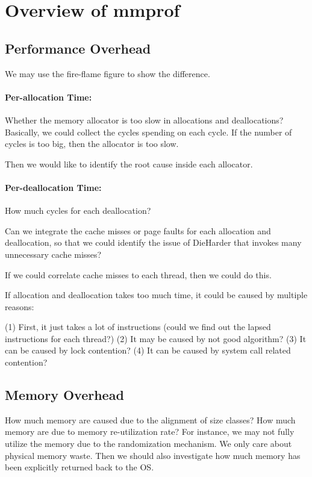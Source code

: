 \section{Overview of mmprof}

\subsection{Performance Overhead}

We may use the fire-flame figure to show the difference. 

\paragraph{Per-allocation Time:}
Whether the memory allocator is too slow in allocations and deallocations? 
Basically, we could collect the cycles spending on each cycle. If the number of cycles is too big, then the allocator is too slow. 

Then we would like to identify the root cause inside each allocator. 

\paragraph{Per-deallocation Time:} 
How much cycles for each deallocation? 

Can we integrate the cache misses or page faults for each allocation and deallocation, so that we could identify the issue of DieHarder that invokes many unnecessary cache misses?

If we could correlate cache misses to each thread, then we could do this. 

If allocation and deallocation takes too much time, it could be caused by multiple reasons:

(1) First, it just takes a lot of instructions (could we find out the lapsed instructions for each thread?)
(2) It may be caused by not good algorithm? 
(3) It can be caused by lock contention?
(4) It can be caused by system call related contention? 

\subsection{Memory Overhead}

How much memory are caused due to the alignment of size classes?
How much memory are due to memory re-utilization rate? For instance, we may not fully utilize the memory due to the randomization mechanism. We only care about physical memory waste. Then we should also investigate how much memory has been explicitly returned back to the OS. 

